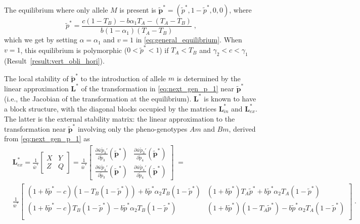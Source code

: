\documentclass[12pt]{extarticle}
\let\vec\mathbf
\begin{document}
\begin{appendices}
The equilibrium where only allele $M$ is present is  $\vec{\tilde{p}^*} = (\tilde{p}^*, 1-\tilde{p}^*, 0, 0)$, where
\begin{equation} \label{eq:p_tilde_star_alpha_1}
\tilde{p}^*=
\frac{c(1-T_B) - b \alpha_1 T_A - (T_A - T_B)}{b(1-\alpha_1)(T_A-T_B)} \;,
\end{equation}
which we get by setting $\alpha=\alpha_1$ and $v=1$ in \autoref{eq:general_equilibrium}.
When $v=1$, this equilibrium is polymorphic ($0 < \tilde{p}^* < 1$) if $T_A<T_B$ and $\gamma_2<c<\gamma_1$ (Result~\ref{result:vert_obli_hori}).

The local stability of $\vec{\tilde{p}^*}$ to the introduction of allele $m$ is determined by the linear approximation $\vec{L}^*$ of the transformation in \autoref{eq:next_gen_p_1} near $\vec{\tilde{p}^*}$ (i.e., the Jacobian of the transformation at the equilibrium).
$\vec{L}^*$ is known to have a block structure, with the diagonal blocks occupied by the matrices $\vec{L}^*_{in}$ and $\vec{L}^*_{ex}$.
The latter is the external stability matrix: the linear approximation to the transformation near $\vec{\tilde{p}^*}$ involving only the pheno-genotypes $Am$ and $Bm$, derived from \autoref{eq:next_gen_p_1} as
\begin{equation} \label{eq:external_stability_matrix}
\begin{aligned}
&\mathbf{L}^*_{ex} = 
 \frac{1}{\bar{w}^*} \begin{bmatrix}
	 X &
	 Y \\
	 Z &
	 Q 
\end{bmatrix} = 
\frac{1}{\bar{w}^*} \begin{bmatrix}
\frac{\partial\bar{w}\tilde{p}_3'}{\partial \tilde{p}_3}(\vec{\tilde{p}}^*) &
\frac{\partial\bar{w}\tilde{p}_3'}{\partial \tilde{p}_4}(\vec{\tilde{p}}^*) \\
\frac{\partial\bar{w}\tilde{p}_4'}{\partial \tilde{p}_3}(\vec{\tilde{p}}^*) &
\frac{\partial\bar{w}\tilde{p}_4'}{\partial \tilde{p}_4}(\vec{\tilde{p}}^*) 
\end{bmatrix} \;= \\
& \frac{1}{\bar{w}^*} \begin{bmatrix}
		(1+b \tilde{p}^* -c)(1-T_B(1-\tilde{p}^*)) + b \tilde{p}^* \alpha_2 T_B (1-\tilde{p}^*) & 
		(1+b \tilde{p}^*) T_A \tilde{p}^* + b \tilde{p}^* \alpha_2 T_A(1-\tilde{p}^*) \\
		(1+b \tilde{p}^* - c) T_B(1-\tilde{p}^*) - b \tilde{p}^* \alpha_2 T_B (1-\tilde{p}^*) &
		(1+b \tilde{p}^*) (1-T_A \tilde{p}^*) - b \tilde{p}^* \alpha_2 T_A (1-\tilde{p}^*) \\
  	\end{bmatrix} \;.
\end{aligned}
\end{equation}


\end{appendices}
\end{document}

